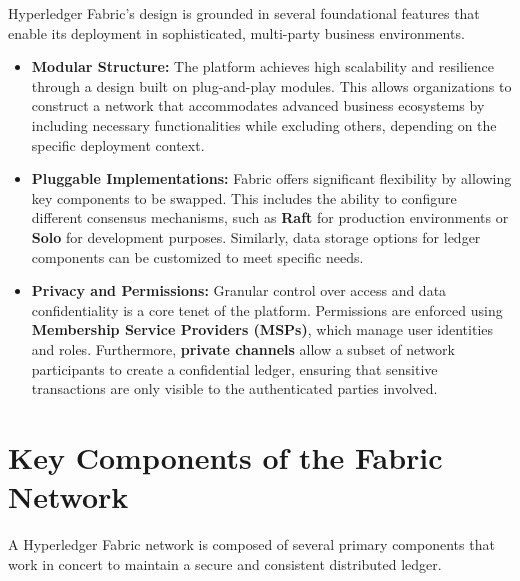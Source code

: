 \documentclass{scrbook}
\begin{document}
Hyperledger Fabric's design is grounded in several foundational features that enable its deployment in sophisticated, multi-party business environments.

\begin{itemize}
    \item \textbf{Modular Structure:} The platform achieves high scalability and resilience through a design built on plug-and-play modules. This allows organizations to construct a network that accommodates advanced business ecosystems by including necessary functionalities while excluding others, depending on the specific deployment context.
    
    \item \textbf{Pluggable Implementations:} Fabric offers significant flexibility by allowing key components to be swapped. This includes the ability to configure different consensus mechanisms, such as \textbf{Raft} for production environments or \textbf{Solo} for development purposes. Similarly, data storage options for ledger components can be customized to meet specific needs.
    
    \item \textbf{Privacy and Permissions:} Granular control over access and data confidentiality is a core tenet of the platform. Permissions are enforced using \textbf{Membership Service Providers (MSPs)}, which manage user identities and roles. Furthermore, \textbf{private channels} allow a subset of network participants to create a confidential ledger, ensuring that sensitive transactions are only visible to the authenticated parties involved.
\end{itemize}

\section{Key Components of the Fabric Network}

A Hyperledger Fabric network is composed of several primary components that work in concert to maintain a secure and consistent distributed ledger.
\end{document}
